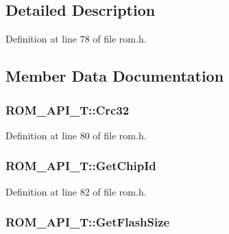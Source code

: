 \subsection{Detailed Description}


Definition at line 78 of file rom.\+h.



\subsection{Member Data Documentation}
\subsubsection[{\texorpdfstring{Crc32}{Crc32}}]{ R\+O\+M\+\_\+\+A\+P\+I\+\_\+\+T\+::\+Crc32}\hypertarget{struct_r_o_m___a_p_i___t_a91d49a9c55a7b5d10361aca6cb94d704}{}\label{struct_r_o_m___a_p_i___t_a91d49a9c55a7b5d10361aca6cb94d704}


Definition at line 80 of file rom.\+h.

\subsubsection[{\texorpdfstring{Get\+Chip\+Id}{GetChipId}}]{ R\+O\+M\+\_\+\+A\+P\+I\+\_\+\+T\+::\+Get\+Chip\+Id}\hypertarget{struct_r_o_m___a_p_i___t_a3f6ccfd898f1b48c225da2ca1627cff3}{}\label{struct_r_o_m___a_p_i___t_a3f6ccfd898f1b48c225da2ca1627cff3}


Definition at line 82 of file rom.\+h.

\subsubsection[{\texorpdfstring{Get\+Flash\+Size}{GetFlashSize}}]{ R\+O\+M\+\_\+\+A\+P\+I\+\_\+\+T\+::\+Get\+Flash\+Size}\hypertarget{struct_r_o_m___a_p_i___t_ab95dee37617df708f8cbd432246a9782}{}\label{struct_r_o_m___a_p_i___t_ab95dee37617df708f8cbd432246a9782}


